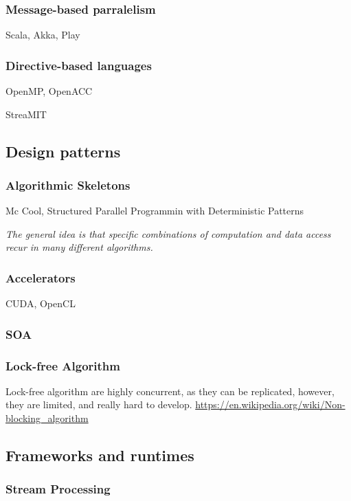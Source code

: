 \subsubsection{Message-based parralelism}
Scala, Akka, Play

\subsubsection{Directive-based languages}
OpenMP, OpenACC


StreaMIT



\subsection{Design patterns}

\subsubsection{Algorithmic Skeletons}
\cite{McCool2010} Mc Cool, Structured Parallel Programmin with Deterministic Patterns

\textit{The general idea is that specific combinations of computation and data access recur in many different algorithms.}

\subsubsection{Accelerators}
CUDA, OpenCL

\subsubsection{SOA}

\subsubsection{Lock-free Algorithm}

  Lock-free algorithm are highly concurrent, as they can be replicated, however, they are limited, and really hard to develop.
  \url{https://en.wikipedia.org/wiki/Non-blocking_algorithm}


\subsection{Frameworks and runtimes}

\subsubsection{Stream Processing}


